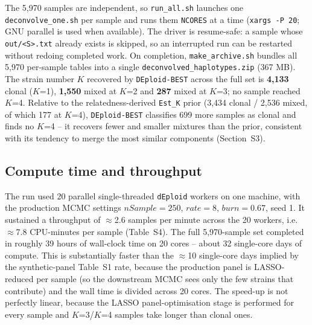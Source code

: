 \documentclass{article}
\begin{document}
The 5,970 samples are independent, so \texttt{run\_all.sh} launches one
\texttt{deconvolve\_one.sh} per sample and runs them \texttt{NCORES} at a time
(\texttt{xargs -P 20}; GNU parallel is used when available). The driver is
resume-safe: a sample whose \texttt{out/<S>.txt} already exists is skipped, so
an interrupted run can be restarted without redoing completed work. On
completion, \texttt{make\_archive.sh} bundles all 5,970 per-sample tables
into a single \texttt{deconvolved\_haplotypes.zip} (367 MB). The strain number
$K$ recovered by \texttt{DEploid-BEST} across the full set is \textbf{4,133}
clonal ($K$=1), \textbf{1,550} mixed at $K$=2 and \textbf{287} mixed at $K$=3;
no sample reached $K$=4. Relative to the relatedness-derived \texttt{Est\_K}
prior (3,434 clonal / 2,536 mixed, of which 177 at $K$=4), \texttt{DEploid-BEST}
classifies 699 more samples as clonal and finds no $K$=4 -- it recovers fewer
and smaller mixtures than the prior, consistent with its tendency to merge the
most similar components (Section~S3).

\subsection{Compute time and throughput}
\label{sec:field-time}

The run used 20 parallel single-threaded \texttt{dEploid} workers on one
machine, with the production MCMC settings $nSample = 250$, $rate = 8$,
$burn = 0.67$, seed 1. It sustained a throughput of $\approx$2.6 samples per
minute across the 20 workers, i.e.\ $\approx$7.8 CPU-minutes per sample
(Table~S4). The full 5,970-sample set completed in
roughly 39 hours of wall-clock time on 20 cores -- about 32 single-core days
of compute. This is substantially faster than the $\approx$10 single-core days
implied by the synthetic-panel Table~S1 rate, because the production panel is
LASSO-reduced per sample (so the downstream MCMC sees only the few strains
that contribute) and the wall time is divided across 20 cores. The
speed-up is not perfectly linear, because the LASSO panel-optimisation stage
is performed for every sample and $K$=3/$K$=4 samples take longer than
clonal ones.
\end{document}
